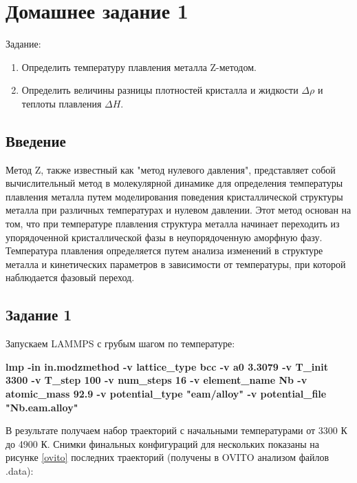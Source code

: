 \documentclass[a4paper,oneside,14pt]{extreport}
\begin{document}
\chapter*{Домашнее задание 1}

Задание:
\begin{enumerate}
	\item Определить температуру плавления металла Z-методом.
	\item Определить величины разницы плотностей кристалла и жидкости $\Delta \rho$ и теплоты плавления $\Delta H$.
\end{enumerate}

\section*{Введение}
Метод Z, также известный как "метод нулевого давления", представляет собой вычислительный метод в молекулярной динамике для определения температуры плавления металла путем моделирования поведения кристаллической структуры металла при различных температурах и нулевом давлении. Этот метод основан на том, что при температуре плавления структура металла начинает переходить из упорядоченной кристаллической фазы в неупорядоченную аморфную фазу. Температура плавления определяется путем анализа изменений в структуре металла и кинетических параметров в зависимости от температуры, при которой наблюдается фазовый переход.

\section*{Задание 1}

Запускаем LAMMPS с грубым шагом по температуре:

\textbf{lmp -in in.modzmethod -v lattice\_type bcc -v a0 3.3079 -v T\_init 3300 -v T\_step 100 -v num\_steps 16 -v element\_name Nb -v atomic\_mass 92.9 -v potential\_type "eam/alloy" -v potential\_file "Nb.eam.alloy"}


В результате получаем набор траекторий с начальными температурами от 3300 К
до  4900 К. Снимки финальных конфигураций для нескольких показаны на рисунке \ref{ovito}
последних траекторий (получены в OVITO анализом файлов .data):
\end{document}
